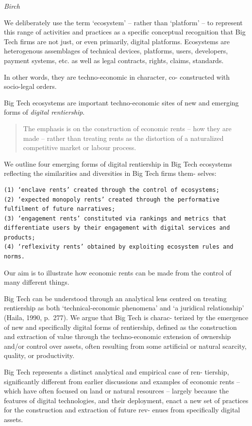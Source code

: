 \documentclass[
]{book}
\begin{document}
\emph{Birch}

We deliberately use the term `ecosystem' -- rather than `platform' --
to represent this range of
activities and practices as a specific conceptual recognition that Big Tech
firms are not just, or even primarily, digital platforms. Ecosystems are
heterogenous assemblages of technical devices, platforms, users, developers, payment
systems, etc. as well as legal contracts, rights, claims, standards.

In other words, they are techno-economic in character, co-
constructed with socio-legal orders.

Big Tech ecosystems are important techno-economic sites of
new and emerging forms of \emph{digital rentiership}.

\begin{quote}
The emphasis is on
the construction of economic rents -- how they are made -- rather than treating
rents as the distortion of a naturalized competitive market or labour process.
\end{quote}

We outline four emerging forms of digital rentiership in Big Tech
ecosystems reflecting the similarities and diversities in Big Tech firms them-
selves:

\begin{verbatim}
(1) ‘enclave rents’ created through the control of ecosystems;  
(2) ‘expected monopoly rents’ created through the performative fulfilment of future narratives;   
(3) ‘engagement rents’ constituted via rankings and metrics that differentiate users by their engagement with digital services and products;  
(4) ‘reflexivity rents’ obtained by exploiting ecosystem rules and norms.  
\end{verbatim}

Our aim is to illustrate how economic rents can be made from the
control of many different things.

Big Tech can be understood through an analytical lens
centred on treating rentiership as both `technical-economic phenomena' and
`a juridical relationship' (Haila, 1990, p.~277). We argue that Big Tech is charac-
terized by the emergence of new and specifically digital forms of rentiership,
defined as the construction and extraction of value through the techno-economic
extension of ownership and/or control over assets, often resulting from some
artificial or natural scarcity, quality, or productivity.

Big Tech represents a distinct analytical and empirical case of ren-
tiership, significantly different from earlier discussions and examples of
economic rents -- which have often focused on land or natural resources --
largely because the features of digital technologies, and their deployment,
enact a new set of practices for the construction and extraction of future rev-
enues from specifically digital assets.
\end{document}
